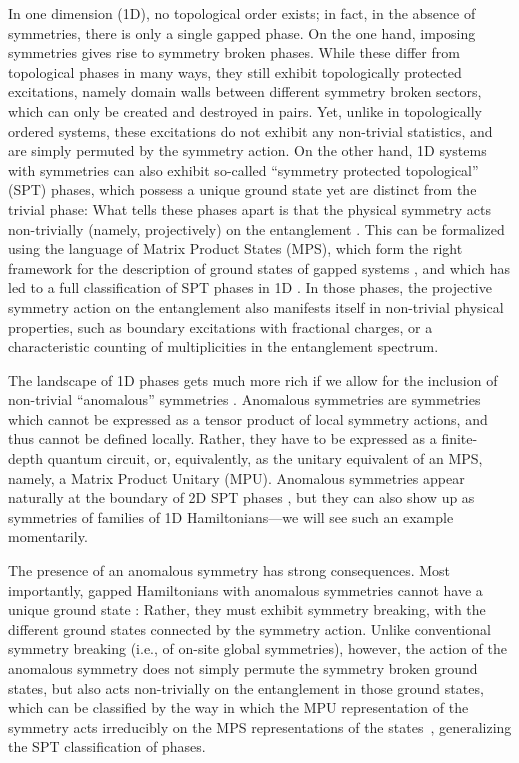 \documentclass[aps,pra,export,nofootinbib]{revtex4-2}
\begin{document}
In one dimension (1D), no topological order exists; in fact, in the absence of symmetries, there is only a single gapped phase. On the one hand, imposing symmetries gives rise to symmetry broken phases. While these differ from topological phases in many ways, they still exhibit topologically protected excitations, namely domain walls between different symmetry broken
sectors, which can only be created and destroyed in pairs.  Yet, unlike in topologically ordered systems, these excitations do not
exhibit any non-trivial statistics, and are simply permuted by the symmetry action. On the other hand, 1D systems with symmetries can also exhibit so-called ``symmetry protected topological''
(SPT) phases, which possess a unique ground state yet are distinct from the trivial phase: What tells these phases apart is that the physical symmetry acts non-trivially (namely, projectively) on the entanglement \cite{Pollmann10}. This can be formalized using the language of Matrix Product States (MPS), which form the right framework for the description of ground states of gapped systems \cite{Hastings07A, Hastings07B},
and which has led to a full classification of SPT phases in 1D \cite{Schuch11,Chen11B}.
In those phases, the projective symmetry action on the
entanglement also manifests itself in non-trivial physical properties, such as boundary excitations with fractional charges, or a characteristic counting of multiplicities in the entanglement spectrum.

The landscape of 1D phases gets much more rich if we allow
for the inclusion of non-trivial ``anomalous'' symmetries \cite{Wen13,kapustin14}.
Anomalous symmetries are symmetries which cannot be expressed as
a tensor product of local symmetry actions, and thus cannot be
defined locally.  Rather, they have to be expressed as a
finite-depth quantum circuit, or, equivalently, as the unitary
equivalent of an MPS, namely, a Matrix Product Unitary (MPU)\cite{Cirac17B}. Anomalous symmetries appear naturally at the boundary of 2D SPT phases \cite{Chen11A}, but they can also show up as symmetries of families of 1D Hamiltonians---we will see such an example momentarily. 

The presence of an anomalous symmetry has strong consequences.
Most importantly, gapped Hamiltonians with anomalous symmetries
cannot have a unique ground state \cite{Chen11A,reviewPEPS}: Rather, they must exhibit
symmetry breaking, with the different ground states connected by
the symmetry action. Unlike conventional symmetry breaking
(i.e., of on-site global symmetries), however, the action of the anomalous
symmetry does not simply permute the symmetry broken ground
states, but also acts non-trivially on the entanglement in those
ground states, which can be classified by the way 
in which the MPU representation of the symmetry acts irreducibly
on the MPS representations of the states~\cite{Garre22},
generalizing the SPT classification of phases. 
\end{document}
